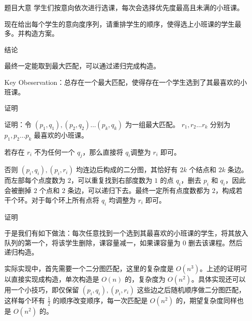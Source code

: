 \begin{frame}{题目大意}
	学生们按意向依次进行选课，每次会选择优先度最高且未满的小班课。

	现在给出每个学生的意向度序列，请重排学生的顺序，使得选上小班课的学生最多。并构造方案。
\end{frame}

\begin{frame}{结论}

最终一定能取到最大匹配，可以通过递归完成构造。

Key Obeservation：总存在一个最大匹配，使得存在一个学生选到了其最喜欢的小班课。

\end{frame}

\begin{frame}{证明}

证明：令 $(p_1,q_1),(p_2,q_2)\dots (p_k,q_k)$ 为一组最大匹配。 $r_1,r_2\dots r_k$ 分别为 $p_1,p_2\dots p_k$ 最喜欢的小班课。\pause

若存在 $r_i$ 不为任何一个 $q_j$，那么直接将 $q_i$调整为 $r_i$ 即可。\pause

否则 $(p_i,q_i),(p_i,r_i)$ 均连边后构成的二分图，其恰好有 $2k$ 个结点和 $2k$ 条边。而左部每个点度数为 $2$，可以重复找到右部度数为 $1$ 的点 $q_i$，删去 $p_i$ 和 $q_i$，因此会被删掉 $2$ 个点和 $2$ 条边，可以递归下去。最终一定所有点度数都为 $2$，构成若干个环。对于每个环上所有点将 $q_i$ 均调整为 $r_i$ 即可。


\end{frame}

\begin{frame}{证明}

于是我们有如下做法：每次任意找到一个选到其最喜欢的小班课的学生，将其放入队列的第一个，将该学生删除，课容量减一，如果课容量为 $0$ 删去该课程。然后递归构造。 \pause

实际实现中，首先需要一个二分图匹配，这里的复杂度是 $O(n^3)$。上述的证明可以直接实现成构造，单次构造是 $O(n)$ 的，复杂度为 $O(n^2)$。具体实现还可以用一个小技巧，即仅保留 $(p_i,q_i),(p_i,r_i)$ 这些边之后随机顺序做二分图匹配，这样每个环有 $\frac{1}{2}$ 的顺序改变顺序，每一次匹配是 $O(n^2)$ 的，期望复杂度同样也是 $O(n^2)$ 的。
	
\end{frame}